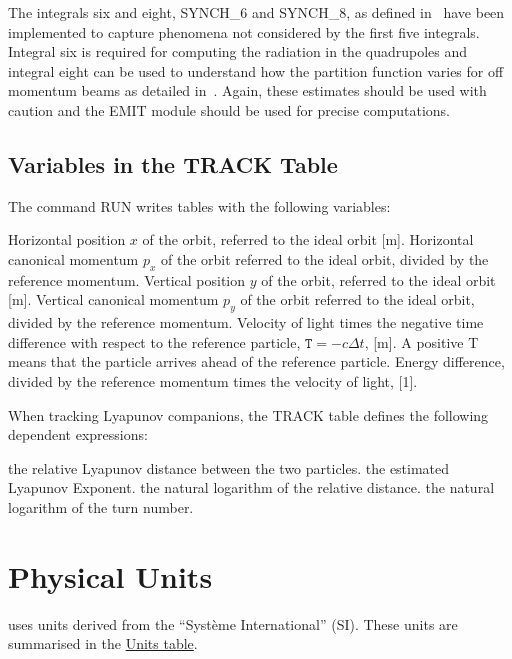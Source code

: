 The integrals six and eight,  SYNCH\_6 and SYNCH\_8, as defined 
in~\cite{Jowett1986} have been implemented to capture phenomena 
not considered by the first five integrals. Integral six is required 
for computing the radiation in the quadrupoles and integral eight 
can be used to understand how the partition function varies for off 
momentum beams as detailed in~\cite{Jowett1986}. Again, these 
estimates should be used with caution and the EMIT module should 
be used for precise computations.

\subsection{Variables in the TRACK Table}
\label{subsec:tables-track}
The command RUN writes tables with the following variables: 
\begin{madlist}
   Horizontal position $x$ of the orbit, referred to the
  ideal orbit [m].    
   Horizontal canonical momentum $p_x$ of the orbit
  referred to the ideal orbit, divided by the reference momentum.    
   Vertical position $y$ of the orbit, referred to the
  ideal orbit [m].    
   Vertical canonical momentum $p_y$ of the orbit
  referred to the ideal orbit, divided by the reference momentum.    
   Velocity of light times the negative time difference with
  respect to the reference particle, $\mathtt{T}=-c\Delta t$, [m]. 
  A positive T means that the particle arrives ahead of the reference
  particle.    
   Energy difference, divided by the reference momentum times
  the velocity of light, [1].
\end{madlist} 

When tracking Lyapunov companions, the TRACK table defines the following
dependent expressions:  
\begin{madlist}
   the relative Lyapunov distance between the two particles.    
   the estimated Lyapunov Exponent.   
   the natural logarithm of the relative distance.   
   the natural logarithm of the turn number.   
\end{madlist}





\section{Physical Units}
\label{sec:units}
\madx uses units derived from the ``Syst\`eme
International'' (SI). These units are summarised in the
\hyperlink{table}{Units table}.  

